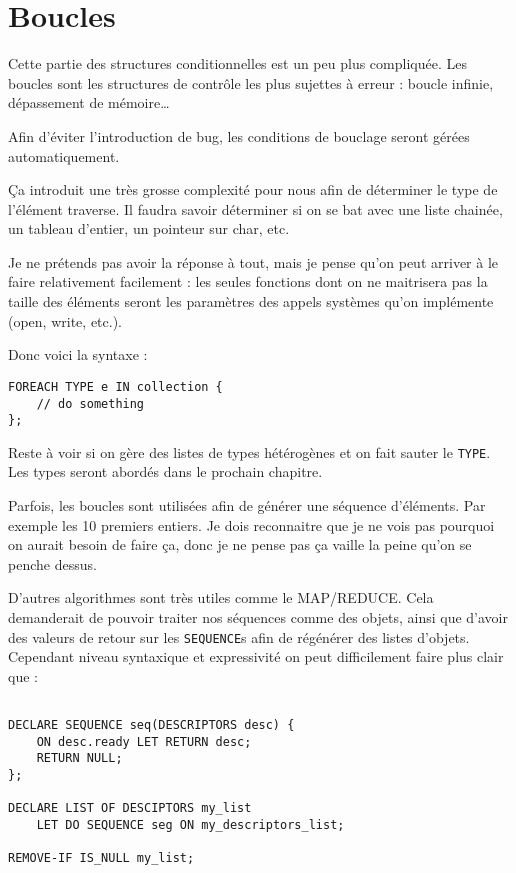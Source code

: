 \documentclass{rtxreport}
\begin{document}
\section{Boucles}
Cette partie des structures conditionnelles est un peu plus compliquée.
Les boucles sont les structures de contrôle les plus sujettes à erreur : boucle
infinie, dépassement de mémoire\ldots

Afin d’éviter l’introduction de bug, les conditions de bouclage seront gérées
automatiquement.

Ça introduit une très grosse complexité pour nous afin de déterminer le type de
l’élément traverse. Il faudra savoir déterminer si on se bat avec une liste
chainée, un tableau d’entier, un pointeur sur char, etc.

Je ne prétends pas avoir la réponse à tout, mais je pense qu’on peut arriver à
le faire relativement facilement : les seules fonctions dont on ne maitrisera
pas la taille des éléments seront les paramètres des appels systèmes qu’on
implémente (open, write, etc.).

Donc voici la syntaxe :
\begin{lstlisting}
FOREACH TYPE e IN collection {
	// do something
};
\end{lstlisting}

Reste à voir si on gère des listes de types hétérogènes et on fait sauter le
\texttt{TYPE}. Les types seront abordés dans le prochain chapitre.

Parfois, les boucles sont utilisées afin de générer une séquence d’éléments.
Par exemple les 10 premiers entiers. Je dois reconnaitre que je ne vois pas
pourquoi on aurait besoin de faire ça, donc je ne pense pas ça vaille la peine
qu’on se penche dessus.

D’autres algorithmes sont très utiles comme le MAP/REDUCE. Cela demanderait de
pouvoir traiter nos séquences comme des objets, ainsi que d’avoir des valeurs
de retour sur les \texttt{SEQUENCE}s afin de régénérer des listes d’objets.
Cependant niveau syntaxique et expressivité on peut difficilement faire plus
clair que :
\begin{lstlisting}

DECLARE SEQUENCE seq(DESCRIPTORS desc) {
	ON desc.ready LET RETURN desc;
	RETURN NULL;
};

DECLARE LIST OF DESCIPTORS my_list
	LET DO SEQUENCE seg ON my_descriptors_list;

REMOVE-IF IS_NULL my_list;

\end{lstlisting}
\end{document}
